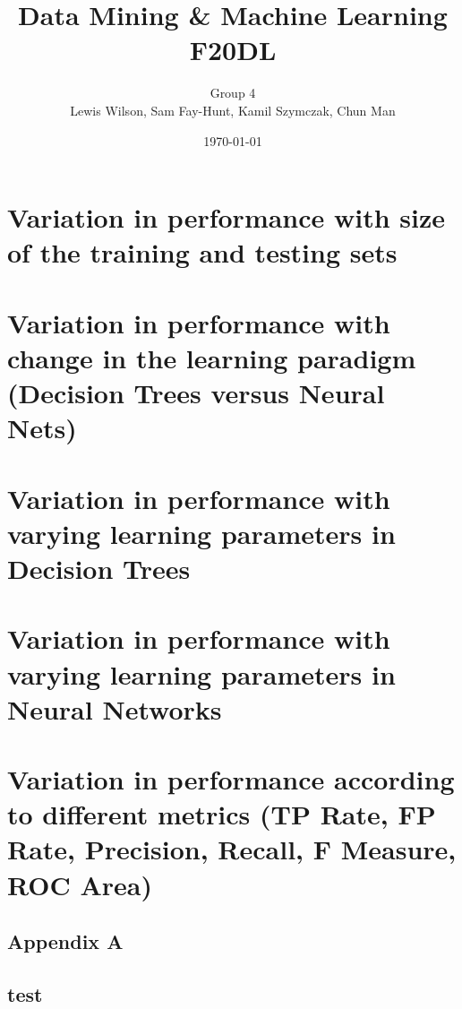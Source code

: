 \documentclass[11pt]{article}
\begin{document}
\title{\huge Data Mining \& Machine Learning F20DL} 
\author{Group 4\\Lewis Wilson, Sam Fay-Hunt, Kamil Szymczak, Chun Man }
\date{\today}
\maketitle

\newpage
\tableofcontents
\thispagestyle{empty}
\pagebreak
\setcounter{page}{1}

\newpage
\section{Variation in performance with size of the training and testing sets}

\newpage
\section{Variation in performance with change in the learning paradigm (Decision Trees versus
Neural Nets)}

\newpage
\section{Variation in performance with varying learning parameters in Decision Trees}

\newpage
\section{Variation in performance with varying learning parameters in Neural Networks}

\newpage
\section{Variation in performance according to different metrics (TP Rate, FP Rate, Precision,
Recall, F Measure, ROC Area)}

\pagebreak
\appendix
\appendixpage
\addappheadtotoc
\begin{appendices}

\section{Appendix A}
\subsection{test}








\end{appendices}
\end{document}
